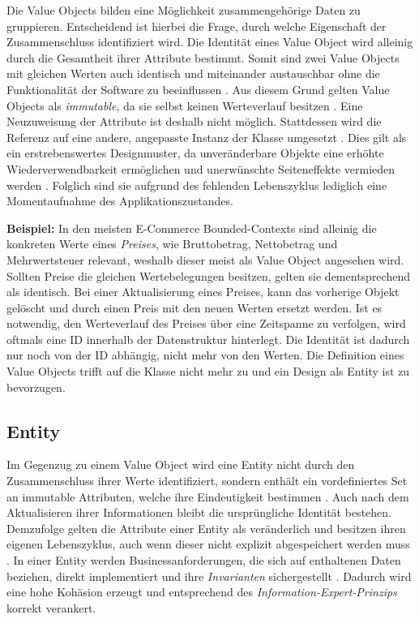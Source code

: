 Die Value Objects bilden eine Möglichkeit zusammengehörige Daten zu gruppieren. Entscheidend ist hierbei die Frage, durch welche Eigenschaft der Zusammenschluss identifiziert wird. Die Identität eines Value Object wird alleinig durch die Gesamtheit ihrer Attribute bestimmt. Somit sind zwei Value Objects mit gleichen Werten auch identisch und miteinander austauschbar ohne die Funktionalität der Software zu beeinflussen \cite[S. 227]{Vernon.2015}. Aus diesem Grund gelten Value Objects als \emph{\gls{immutable}}, da sie selbst keinen Werteverlauf besitzen \cite[S. 99]{Evans.2011}. Eine Neuzuweisung der Attribute ist deshalb nicht möglich. Stattdessen wird die Referenz auf eine andere, angepasste Instanz der Klasse umgesetzt \cite[S. 226]{Vernon.2015}. Dies gilt als ein erstrebenswertes Designmuster, da unveränderbare Objekte eine erhöhte Wiederverwendbarkeit ermöglichen und unerwünschte Seiteneffekte vermieden werden \cite[S. 228f.]{Vernon.2015}. Folglich sind sie aufgrund des fehlenden Lebenszyklus lediglich eine Momentaufnahme des Applikationszustandes.

\textbf{Beispiel:} In den meisten E-Commerce Bounded-Contexts sind alleinig die konkreten Werte eines \emph{Preises}, wie Bruttobetrag, Nettobetrag und Mehrwertsteuer relevant, weshalb dieser meist als Value Object angesehen wird. Sollten Preise die gleichen Wertebelegungen besitzen, gelten sie dementsprechend als identisch. Bei einer Aktualisierung eines Preises, kann das vorherige Objekt gelöscht und durch einen Preis mit den neuen Werten ersetzt werden. Ist es notwendig, den Werteverlauf des Preises über eine Zeitspanne zu verfolgen, wird oftmals eine ID innerhalb der Datenstruktur hinterlegt. Die Identität ist dadurch nur noch von der ID abhängig, nicht mehr von den Werten. Die Definition eines Value Objects trifft auf die Klasse nicht mehr zu und ein Design als Entity ist zu bevorzugen.  

\pagebreak

\subsection{Entity}

Im Gegenzug zu einem Value Object wird eine Entity nicht durch den Zusammenschluss ihrer Werte identifiziert, sondern enthält ein vordefiniertes Set an \gls{immutable} Attributen, welche ihre Eindeutigkeit bestimmen \cite[S. 94]{Evans.2011}. Auch nach dem Aktualisieren ihrer Informationen bleibt die ursprüngliche Identität bestehen. Demzufolge gelten die Attribute einer Entity als veränderlich und besitzen ihren eigenen Lebenszyklus, auch wenn dieser nicht explizit abgespeichert werden muss \cite[S. 172]{Vernon.2015}. In einer Entity werden Businessanforderungen, die sich auf enthaltenen Daten beziehen, direkt implementiert und ihre \emph{\Gls{Invariante}n} sichergestellt \cite[S. 208f.]{Vernon.2015}. Dadurch wird eine hohe Kohäsion erzeugt und entsprechend des \emph{\Gls{Information-Expert-Prinzip}s} korrekt verankert.

